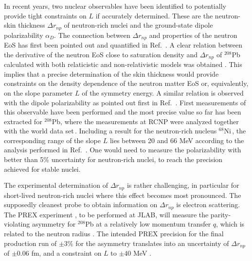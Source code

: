 \documentclass[english,aps,prl,twocolumn,superscriptaddress]{revtex4}
\begin{document}
In recent years, two nuclear observables have been identified to potentially provide tight constraints on $L$ if accurately determined. These are the neutron-skin thickness $\Delta r_{np}$ of neutron-rich nuclei and the ground-state dipole polarizability $\alpha_D$. The connection between $\Delta r_{np}$ and properties of the neutron EoS has first been pointed out and quantified in Ref.\ \cite{Bro00}. A clear relation between the derivative of the neutron EoS close to saturation density and $\Delta r_{np}$ of $^{208}$Pb calculated with both relaticistic and non-relativistic models  was obtained \cite{Bro00,TB01}. This implies that a precise determination of the skin thickness would provide constraints on the density dependence of the neutron matter EoS or, equivalently, on the slope parameter $L$ of the symmetry energy. A similar relation is observed with the dipole polarizability as pointed out first in Ref.\ \cite{RNa10}. First measurements of this observable have been performed and the most precise value so far has been extracted for  $^{208}$Pb, where the measurements at RCNP were analyzed together with the world data set\,\cite{Tam11}. Including a result for the neutron-rich nucleus $^{68}$Ni\,\cite{Ros13}, the corresponding range of the slope $L$ lies between 20 and 66 MeV according to the analysis performed in Ref.\ \cite{Roc15}. One would need to measure the polarizability with better than 5\% uncertainty for neutron-rich nuclei, to reach the precision achieved for stable nuclei.

The experimental determination of $\Delta r_{np}$ is rather challenging, in particular for short-lived neutron-rich nuclei where this effect becomes most pronounced. The supposedly cleanest probe to obtain information on $\Delta r_{np}$ is electron scattering. The PREX experiment \cite{Abra12}, to be performed at JLAB, will measure the parity-violating asymmetry for $^{208}$Pb at a relatively low momentum transfer $q$, which is related to the neutron radius  \cite{Roc11}. The intended PREX precision for the final production run of $\pm 3$\% for the asymmetry translates into an uncertainty of $\Delta r_{np}$ of $\pm 0.06$ fm, and a constraint on $L$ to $\pm 40$ MeV \cite{Roc11}. 
\end{document}
